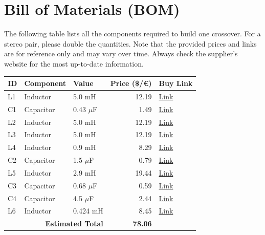 \documentclass[11pt,a4paper]{report}
\begin{document}
\chapter{Bill of Materials (BOM)}
The following table lists all the components required to build one crossover. For a stereo pair, please double the quantities. Note that the provided prices and links are for reference only and may vary over time. Always check the supplier's website for the most up-to-date information.

\vspace{0.5cm}
\begin{table}[H]
    \centering
    \renewcommand{\arraystretch}{1.5}
    \begin{tabular}{@{}lllrl@{}}
        \toprule
        \textbf{ID} & \textbf{Component} & \textbf{Value} & \textbf{Price (\$/€)} & \textbf{Buy Link} \\
        \midrule
        L1 & Inductor & 5.0 mH & 12.19 & \href{https://www.parts-express.com/Dayton-Audio-IC185-5.0mH-18-AWG-Laminated-Iron-Core-Inductor-257-668}{Link} \\
        C1 & Capacitor & 0.43 $\mu$F & 1.49 & \href{https://www.soundimports.eu/en/jantzen-audio-001-0218.html}{Link} \\
        L2 & Inductor & 5.0 mH & 12.19 & \href{https://www.parts-express.com/Dayton-Audio-IC185-5.0mH-18-AWG-Laminated-Iron-Core-Inductor-257-668}{Link} \\
        L3 & Inductor & 5.0 mH & 12.19 & \href{https://www.parts-express.com/Dayton-Audio-IC185-5.0mH-18-AWG-Laminated-Iron-Core-Inductor-257-668}{Link} \\
        L4 & Inductor & 0.9 mH & 8.29 & \href{https://www.parts-express.com/Dayton-Audio-LW18-90-0.90mH-18-AWG-Perfect-Layer-Inductor-257-824}{Link} \\
        C2 & Capacitor & 1.5 $\mu$F & 0.79 & \href{https://www.parts-express.com/Solen-1.5uF-400V-Polypropylene-Capacitor-027-528}{Link} \\
        L5 & Inductor & 2.9 mH & 19.44 & \href{https://www.soundimports.eu/en/jantzen-audio-000-0990.html}{Link} \\
        C3 & Capacitor & 0.68 $\mu$F & 0.59 & \href{https://www.parts-express.com/Dayton-Audio-DMPC-0.68-0.68uF-250V-Polypropylene-Capacitor-027-408}{Link} \\
        C4 & Capacitor & 4.5 $\mu$F & 2.44 & \href{https://www.soundimports.eu/en/jantzen-audio-001-0249.html}{Link} \\
        L6 & Inductor & 0.424 mH & 8.45 & \href{https://www.soundimports.eu/en/jantzen-audio-000-0911.html}{Link} \\
        \midrule
        \multicolumn{3}{r}{\textbf{Estimated Total}} & \textbf{78.06} & \\
        \bottomrule
    \end{tabular}
\end{table}
\end{document}
